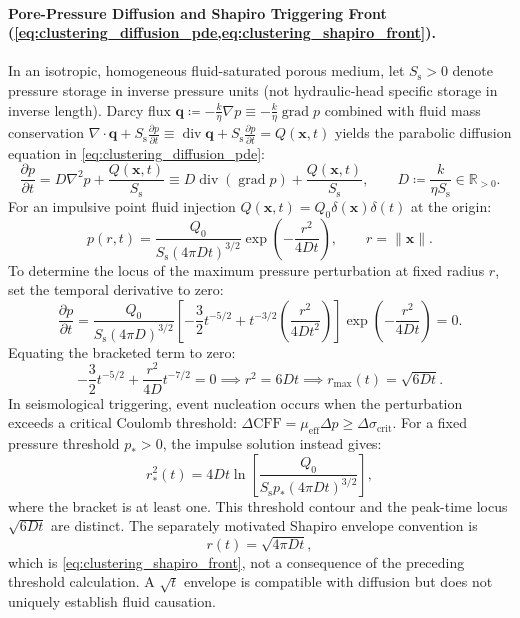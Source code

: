 \paragraph{Pore-Pressure Diffusion and Shapiro Triggering Front
(\cref{eq:clustering_diffusion_pde,eq:clustering_shapiro_front}).}
In an isotropic, homogeneous fluid-saturated porous medium, let
$S_{\mathrm s}>0$ denote pressure storage in inverse pressure units
(not hydraulic-head specific storage in inverse length). Darcy flux
$\mathbf{q} \coloneqq -\frac{k}{\eta}\nabla p \equiv
-\frac{k}{\eta}\operatorname{grad} p$
combined with fluid mass conservation $\nabla \cdot \mathbf{q} +
S_{\mathrm{s}}\frac{\partial p}{\partial t} \equiv
\operatorname{div}\mathbf{q} +
S_{\mathrm{s}}\frac{\partial p}{\partial t} = Q(\mathbf{x}, t)$
yields the parabolic diffusion equation in \cref{eq:clustering_diffusion_pde}:
\begin{equation}
  \frac{\partial p}{\partial t} = D \nabla^2 p + \frac{Q(\mathbf{x},
  t)}{S_{\mathrm{s}}} \equiv D
  \operatorname{div}(\operatorname{grad} p) + \frac{Q(\mathbf{x},
  t)}{S_{\mathrm{s}}}, \qquad D \coloneqq \frac{k}{\eta
  S_{\mathrm{s}}} \in \mathbb{R}_{>0}.
\end{equation}
For an impulsive point fluid injection $Q(\mathbf{x}, t) = Q_0
\delta(\mathbf{x})\delta(t)$ at the origin:
\begin{equation}
  p(r, t) = \frac{Q_0}{S_{\mathrm{s}}(4\pi D t)^{3/2}}
  \exp\left(-\frac{r^2}{4Dt}\right), \qquad r = \|\mathbf{x}\|.
\end{equation}
To determine the locus of the maximum pressure perturbation at fixed
radius $r$,
set the temporal derivative to zero:
\begin{equation}
  \frac{\partial p}{\partial t} = \frac{Q_0}{S_{\mathrm{s}}(4\pi
  D)^{3/2}} \left[ -\frac{3}{2}t^{-5/2} +
  t^{-3/2}\left(\frac{r^2}{4D t^2}\right) \right]
  \exp\left(-\frac{r^2}{4Dt}\right) = 0.
\end{equation}
Equating the bracketed term to zero:
\begin{equation}
  -\frac{3}{2}t^{-5/2} + \frac{r^2}{4D}t^{-7/2} = 0 \implies r^2 = 6
  D t \implies r_{\max}(t) = \sqrt{6Dt}.
\end{equation}
In seismological triggering, event nucleation occurs when the
perturbation exceeds a critical
Coulomb threshold: $\Delta\mathrm{CFF} = \mu_{\mathrm{eff}}\Delta p
\ge \Delta\sigma_{\mathrm{crit}}$.
For a fixed pressure threshold $p_*>0$, the impulse solution instead gives:
\begin{equation}
  r_*^2(t)=4Dt\ln\left[
  \frac{Q_0}{S_{\mathrm s}p_*(4\pi Dt)^{3/2}}\right],
\end{equation}
where the bracket is at least one. This threshold contour and the
peak-time locus $\sqrt{6Dt}$ are distinct. The separately motivated
Shapiro envelope convention \parencite{shapiro1997} is
\begin{equation}
  r(t) = \sqrt{4\pi D t},
\end{equation}
which is \cref{eq:clustering_shapiro_front}, not a consequence of the
preceding threshold calculation. A $\sqrt t$ envelope is compatible with
diffusion but does not uniquely establish fluid causation.

